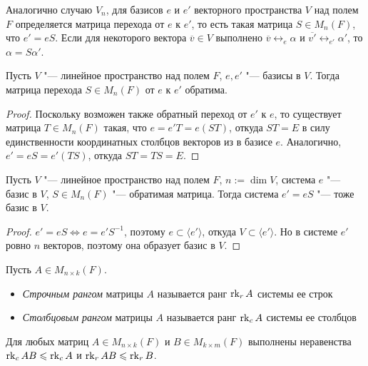 \begin{note}
	Аналогично случаю $V_n$, для базисов $e$ и $e'$ векторного пространства $V$ над полем $F$ определяется матрица перехода от $e$ к $e'$, то есть такая матрица $S \in M_n(F)$, что $e' = eS$. Если для некоторого вектора $\overline{v} \in V$ выполнено $\overline{v} \leftrightarrow_{e} \alpha$ и $\overline{v'} \leftrightarrow_{e'} \alpha'$, то $\alpha = S\alpha'$.
\end{note}

\begin{proposition}
	Пусть $V$ "--- линейное пространство над полем $F$, $e, e'$ "--- базисы в $V$. Тогда матрица перехода $S \in M_n(F)$ от $e$ к $e'$ обратима.
\end{proposition}

\begin{proof}
	Поскольку возможен также обратный переход от $e'$ к $e$, то существует матрица $T \in M_n(F)$ такая, что $e = e'T = e(ST)$, откуда $ST = E$ в силу единственности координатных столбцов векторов из в базисе $e$. Аналогично, $e' = eS = e'(TS)$, откуда $ST = TS = E$.
\end{proof}

\begin{proposition}
	Пусть $V$ "--- линейное пространство над полем $F$, $n := \dim{V}$, система $e$ "--- базис в $V$, $S \in M_n(F)$ "--- обратимая матрица. Тогда система $e' = eS$ "--- тоже базис в $V$.
\end{proposition}

\begin{proof}
	$e' = eS \Leftrightarrow e = e'S^{-1}$, поэтому $e \subset \langle e'\rangle$, откуда $V \subset \langle e'\rangle$. Но в системе $e'$ ровно $n$ векторов, поэтому она образует базис в $V$.
\end{proof}

\begin{definition}
	Пусть $A \in M_{n \times k}(F)$.
	\begin{itemize}
		\item \textit{Строчным рангом} матрицы $A$ называется ранг $\operatorname{rk}_{r}{A}$ системы ее строк
		\item \textit{Столбцовым рангом} матрицы $A$ называется ранг $\operatorname{rk}_{c}{A}$ системы ее столбцов
	\end{itemize}
\end{definition}

\begin{proposition}
	Для любых матриц $A \in M_{n \times k}(F)$ и $B \in M_{k \times m}(F)$ выполнены неравенства $\operatorname{rk}_c{AB} \leqslant \operatorname{rk}_cA$ и $\operatorname{rk}_r{AB} \leqslant \operatorname{rk}_rB$.
\end{proposition}

